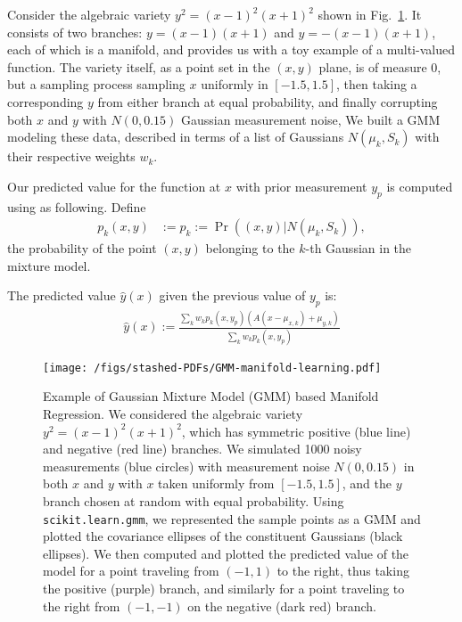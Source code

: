 \documentclass[conference]{IEEEtran}
\begin{document}
Consider the algebraic variety $y^2 = (x - 1)^2 (x + 1)^2$ shown in Fig.~\ref{figXgmm}.
It consists of two branches: $y = (x - 1)(x + 1)$ and $y=-(x - 1)(x + 1)$, each of which is a manifold, and provides us with a toy example of a multi-valued function.
The variety itself, as a point set in the $(x,y)$ plane, is of measure 0, but a sampling process sampling $x$ uniformly in $[-1.5, 1.5]$, then taking a corresponding $y$ from either branch at equal probability, and finally corrupting both $x$ and $y$ with $N(0,0.15)$ Gaussian measurement noise, 
We built a GMM modeling these data, described in terms of a list of Gaussians $N(\mu_k, S_k)$ with their respective weights $w_k$.

Our predicted value for the function at $x$ with prior measurement $y_p$ is computed using as following.
Define 
\begin{align}
   p_k(x,y) &:= p_k := \Pr((x,y) | N(\mu_k, S_k)),
\end{align}
the probability of the point $(x,y)$ belonging to the $k$-th Gaussian in the mixture model.

The predicted value $\hat y(x)$ given the previous value of $y_p$ is:
\begin{align}
  \hat y (x) := \frac{
    \sum_k w_k p_k(x,y_p)  \left( A (x - \mu_{x,k}) + \mu_{y,k} \right) }
  {  \sum_k w_k p_k(x,y_p) }
\end{align}

\begin{figure}[h]
  \centering
  \texttt{[image: /figs/stashed-PDFs/GMM-manifold-learning.pdf]}
  \caption{%
    Example of Gaussian Mixture Model (GMM) based Manifold Regression. %
    We considered the algebraic variety $y^2 = (x-1)^2(x+1)^2$, which has symmetric positive (blue line) and negative (red line) branches. %
    We simulated 1000 noisy measurements (blue circles) with measurement noise $N(0,0.15)$ in both $x$ and $y$ with $x$ taken uniformly from $[-1.5, 1.5]$, and the $y$ branch chosen at random with equal probability. %
    Using \texttt{scikit.learn.gmm}, we represented the sample points as a GMM and plotted the covariance ellipses of the constituent Gaussians (black ellipses). %
    We then computed and plotted the predicted value of the model for a point traveling from $(-1,1)$ to the right, thus taking the positive (purple) branch, and similarly for a point traveling to the right from $(-1,-1)$ on the negative (dark red) branch. %
    \label{figXgmm}
  }
\end{figure}
\end{document}
